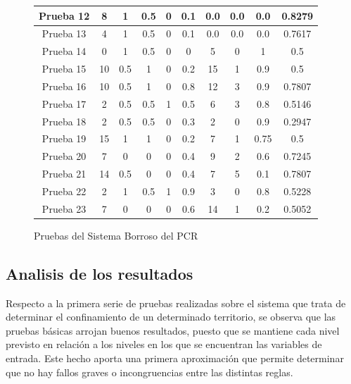 \documentclass[12pt,a4paper, xcolor=table]{article}
\begin{document}
\begin{figure}[!h]
\begin{tabular}{c|c|c|c|c|c|c|c|c|c|}
    \multicolumn{1}{|c|}{Prueba 12} & 8 & 1 & 0.5 & 0 & 0.1 & 0.0 & 0.0 & 0.0 & 0.8279 \\ \hline
    \multicolumn{1}{|c|}{Prueba 13} & 4 & 1 & 0.5 & 0 & 0.1 & 0.0 & 0.0 & 0.0 & 0.7617 \\ \hline
    \multicolumn{1}{|c|}{Prueba 14} & 0 & 1 & 0.5 & 0 & 0 & 5 & 0 & 1 & 0.5 \\ \hline
    \multicolumn{1}{|c|}{Prueba 15} & 10 & 0.5 & 1 & 0 & 0.2 & 15 & 1 & 0.9 & 0.5 \\ \hline
    \multicolumn{1}{|c|}{Prueba 16} & 10 & 0.5 & 1 & 0 & 0.8 & 12 & 3 & 0.9 & 0.7807 \\ \hline
    \multicolumn{1}{|c|}{Prueba 17} & 2 & 0.5 & 0.5 & 1 & 0.5 & 6 & 3 & 0.8 & 0.5146 \\ \hline
    \multicolumn{1}{|c|}{Prueba 18} & 2 & 0.5 & 0.5 & 0 & 0.3 & 2 & 0 & 0.9 & 0.2947 \\ \hline
    \multicolumn{1}{|c|}{Prueba 19} & 15 & 1 & 1 & 0 & 0.2 & 7 & 1 & 0.75 & 0.5 \\ \hline
    \multicolumn{1}{|c|}{Prueba 20} & 7 & 0 & 0 & 0 & 0.4 & 9 & 2 & 0.6 & 0.7245 \\ \hline
    \multicolumn{1}{|c|}{Prueba 21} & 14 & 0.5 & 0 & 0 & 0.4 & 7 & 5 & 0.1 & 0.7807 \\ \hline
    \multicolumn{1}{|c|}{Prueba 22} & 2 & 1 & 0.5 & 1 & 0.9 & 3 & 0 & 0.8 & 0.5228 \\ \hline
    \multicolumn{1}{|c|}{Prueba 23} & 7 & 0 & 0 & 0 & 0.6 & 14 & 1 & 0.2 & 0.5052 \\ \hline
    \end{tabular}
    \caption{Pruebas del Sistema Borroso del PCR}
  \end{figure}

  \newpage

  \subsection{Analisis de los resultados}

  Respecto a la primera serie de pruebas realizadas sobre el sistema que trata de determinar el confinamiento de un determinado territorio, se observa que las pruebas básicas arrojan buenos resultados, puesto que se mantiene cada nivel previsto en relación a los niveles en los que se encuentran las variables de entrada. Este hecho aporta una primera aproximación que permite determinar que no hay fallos graves o incongruencias entre las distintas reglas.

  \vspace{2mm}
\end{document}
